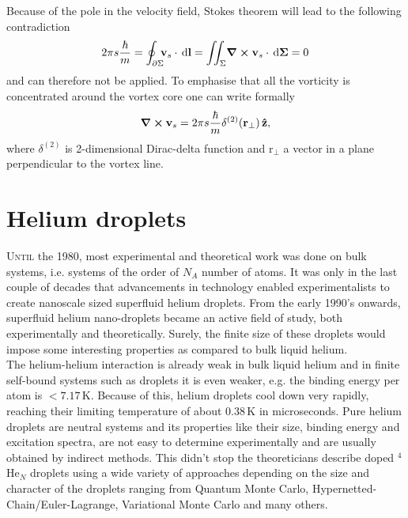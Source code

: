 \documentclass[12pt,a4paper]{book}
\renewcommand{\vec}[1]{\bm{\mathrm{#1}}}
\newcommand{\unit}[1]{\,\mathrm{#1}}
\begin{document}
			Because of the pole in the velocity field, Stokes theorem will lead to the following contradiction
			\begin{align}
				2\pi s\frac{\hbar}{m}=\oint_{\partial\Sigma}\!\!\!\vec{v}_s\cdot\unit{d}\vec{l} = \iint_{\Sigma}\!\curl{\vec{v}_s}\cdot\unit{d}\vec{\Sigma} = 0
			\end{align}
			and can therefore not be applied. To emphasise that all the vorticity is concentrated around the vortex core one can write formally
			\begin{align}
				\curl{\vec{v}_s} = 2\pi s\frac{\hbar}{m}\delta^{(2)}(\vec{r}_\perp)\,\vu{z},
			\end{align}
			where $\delta^{(2)}$ is 2-dimensional Dirac-delta function and $\vec{r}_\perp$ a vector in a plane perpendicular to the vortex line.\\

	\clearpage	
	\section{Helium droplets}
		\lettrine[lines=3,findent=3pt,nindent=0pt]{U}{ntil} the 1980, most experimental and theoretical work was done on bulk systems, i.e. systems of the order of $N_A$ number of atoms. It was only in the last couple of decades that advancements in technology enabled experimentalists to create nanoscale sized superfluid helium droplets. From the early 1990's onwards, superfluid helium nano-droplets became an active field of study, both experimentally and theoretically. Surely, the finite size of these droplets would impose some interesting properties as compared to bulk liquid helium.\\
		
		The helium-helium interaction is already weak in bulk liquid helium and in finite self-bound systems such as droplets it is even weaker, e.g. the binding energy per atom is $<\!7.17\unit{K}$. Because of this, helium droplets cool down very rapidly, reaching their limiting temperature of about $0.38\unit{K}$ in microseconds. Pure helium droplets are neutral systems and its properties like their size, binding energy and excitation spectra, are not easy to determine experimentally and are usually obtained by indirect methods. This didn't stop the theoreticians describe doped $^4$He$_N$ droplets using a wide variety of approaches depending on the size and character of the droplets ranging from Quantum Monte Carlo, Hypernetted-Chain/Euler-Lagrange, Variational Monte Carlo and many others.\\
	
\end{document}
